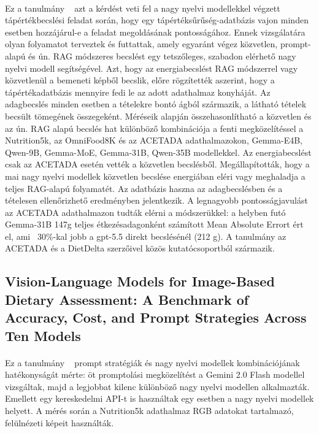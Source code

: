 \paragraph{}Ez a tanulmány ~\cite{coburn2026openknead} azt a kérdést veti fel a nagy nyelvi modellekkel végzett tápértékbecslési feladat során, hogy egy tápértéksűrűség-adatbázis vajon minden esetben hozzájárul-e a feladat megoldásának pontosságához. Ennek vizsgálatára olyan folyamatot terveztek és futtattak, amely egyaránt végez közvetlen, prompt-alapú és ún. RAG módszeres becslést egy tetszőleges, szabadon elérhető nagy nyelvi modell segítségével.
Azt, hogy az energiabecslést RAG módszerrel vagy közvetlenül a bemeneti képből becslik, előre rögzítették aszerint, hogy a tápértékadatbázis mennyire fedi le az adott adathalmaz konyháját. Az adagbecslés minden esetben a tételekre bontó ágból származik, a látható tételek becsült tömegének összegeként.
Méréseik alapján összehasonlítható a közvetlen és az ún. RAG alapú becslés hat különböző kombinációja a fenti megközelítéssel a Nutrition5k, az OmniFood8K és az ACETADA adathalmazokon, Gemma-E4B, Qwen-9B, Gemma-MoE, Gemma-31B, Qwen-35B modellekkel. 
Az energiabecslést csak az ACETADA esetén vették a közvetlen becslésből.
Megállapították, hogy a mai nagy nyelvi modellek közvetlen becslése energiában eléri vagy meghaladja a teljes RAG-alapú folyamatét. Az adatbázis haszna az adagbecslésben és a tételesen ellenőrizhető eredményben jelentkezik.
A legnagyobb pontosságjavulást az ACETADA adathalmazon tudták elérni a módszerükkel: a helyben futó Gemma-31B 147g teljes étkezésadagonként számított Mean Absolute Errort ért el, ami ~30\%-kal jobb a gpt-5.5 direkt becslésénél (212 g).
A tanulmány az ACETADA és a DietDelta szerzőivel közös kutatócsoportból származik.


\subsection{Vision-Language Models for Image-Based Dietary Assessment: A Benchmark of Accuracy, Cost, and Prompt Strategies Across Ten Models}
\paragraph{}Ez a tanulmány ~\cite{sterling2026vlm} prompt stratégiák és nagy nyelvi modellek kombinációjának hatékonyságát mérte: öt promptolási megközelítést a Gemini 2.0 Flash modellel vizsgáltak, majd a legjobbat kilenc különböző nagy nyelvi modellen alkalmazták. Emellett egy kereskedelmi API-t is használtak egy esetben a nagy nyelvi modellek helyett. A mérés során a Nutrition5k adathalmaz RGB adatokat tartalmazó, felülnézeti képeit használták. 

